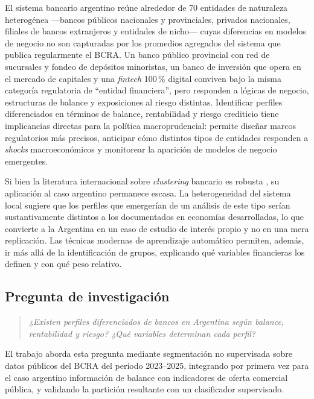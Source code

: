 \documentclass[11pt,a4paper]{article}
\begin{document}
El sistema bancario argentino reúne alrededor de 70 entidades de naturaleza
heterogénea ---bancos públicos nacionales y provinciales, privados nacionales, filiales
de bancos extranjeros y entidades de nicho--- cuyas diferencias en modelos de negocio no
son capturadas por los promedios agregados del sistema que publica regularmente el BCRA.
Un banco público provincial con red de sucursales y fondeo de depósitos minoristas, un
banco de inversión que opera en el mercado de capitales y una \textit{fintech} 100\,\%
digital conviven bajo la misma categoría regulatoria de ``entidad financiera'', pero
responden a lógicas de negocio, estructuras de balance y exposiciones al riesgo distintas.
Identificar perfiles diferenciados en términos de balance, rentabilidad y riesgo crediticio
tiene implicancias directas para la política macroprudencial: permite diseñar
marcos regulatorios más precisos, anticipar cómo distintos tipos de entidades responden a
\textit{shocks} macroeconómicos y monitorear la aparición de modelos de negocio emergentes.

Si bien la literatura internacional sobre \textit{clustering} bancario es robusta
\citep{roengpitya2014,mercadier2025}, su aplicación al caso argentino permanece escasa.
La heterogeneidad del sistema local sugiere que los perfiles que emergerían de un análisis
de este tipo serían sustantivamente distintos a los documentados en economías desarrolladas,
lo que convierte a la Argentina en un caso de estudio de interés propio y no en una mera
replicación. Las técnicas modernas de aprendizaje automático permiten, además, ir más allá
de la identificación de grupos, explicando qué variables financieras los definen y con qué
peso relativo.

\subsection{Pregunta de investigación}

\begin{quote}
\textit{¿Existen perfiles diferenciados de bancos en Argentina según balance, rentabilidad
y riesgo? ¿Qué variables determinan cada perfil?}
\end{quote}

\noindent El trabajo aborda esta pregunta mediante segmentación no supervisada sobre datos
públicos del BCRA del período 2023--2025, integrando por primera vez para el caso argentino
información de balance con indicadores de oferta comercial pública, y validando la partición
resultante con un clasificador supervisado.
\end{document}
